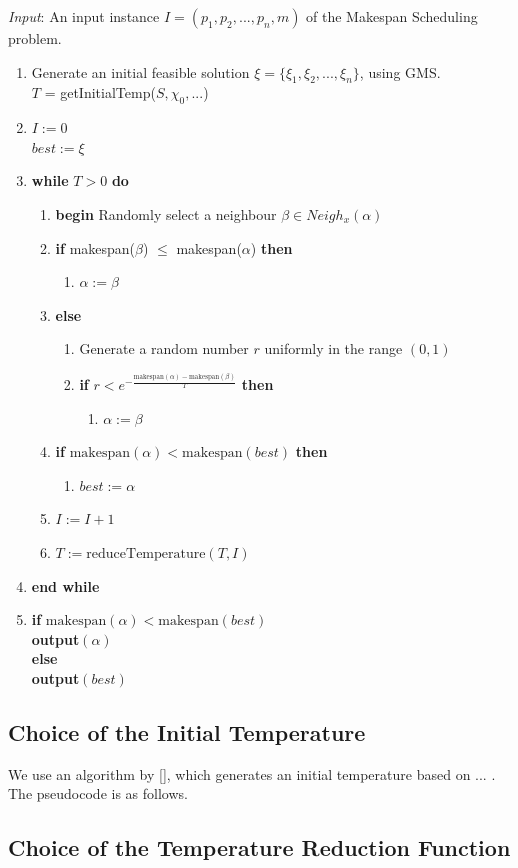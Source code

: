 \documentclass[12pt,a4paper,reqno]{article}
\begin{document}
\emph{Input}: An input instance $I = (p_1,p_2,...,p_n,m)$ of the Makespan Scheduling problem.
\begin{enumerate}
\item Generate an initial feasible solution $\xi = \{\xi_1,\xi_2,...,\xi_n\}$, using GMS. \\
$T$ = getInitialTemp($S, \chi_0,...$)
\item $I := 0$ \\
$best:=\xi$
\item\textbf{while} $T>0$ \textbf{do}
\begin{enumerate}
\item \textbf{begin} Randomly select a neighbour $\beta\in Neigh_x(\alpha)$
\item \textbf{if} makespan($\beta$) $\leq$ makespan($\alpha$) \textbf{then}
\begin{enumerate}
\item $\alpha:=\beta$
\end{enumerate}
\item[] \textbf{else}
\begin{enumerate}
\item Generate a random number $r$ uniformly in the range $(0,1)$
\item \textbf{if} $r<e^{-\frac{\text{makespan}(\alpha)-\text{makespan}(\beta)}{T}}$ \textbf{then}
\begin{enumerate}
\item[] $\alpha:=\beta$
\end{enumerate}
\end{enumerate}
\item \textbf{if}
$\text{makespan}(\alpha) < \text{makespan}(best)$ \textbf{then}
\begin{enumerate}
\item[] $best:=\alpha$
\end{enumerate}
\item $I:=I+1$
\item $T:=\text{reduceTemperature}(T,I)$
\end{enumerate}
\item[] \textbf{end while}
\item \textbf{if} $\text{makespan}(\alpha) < \text{makespan}(best)$ \\
\indent \textbf{output}$(\alpha)$ \\
\textbf{else} \\
\indent \textbf{output}$(best)$
\end{enumerate}

\subsection*{Choice of the Initial Temperature}
We use an algorithm by \ref{}, which generates an initial temperature based on ... . The pseudocode is as follows.

\subsection*{Choice of the Temperature Reduction Function}
\end{document}

